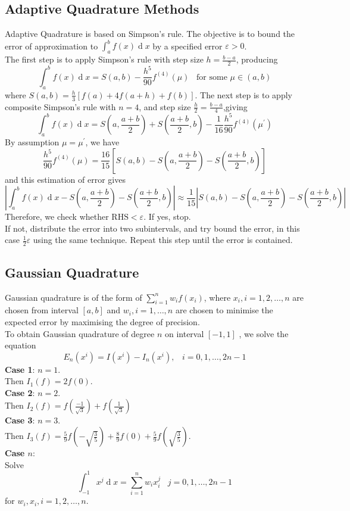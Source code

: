\documentclass[12pt]{article}
\theoremstyle{definition}
\DeclareMathOperator{\diff}{d}
\begin{document}
\subsection{Adaptive Quadrature Methods}
Adaptive Quadrature is based on Simpson's rule. The objective is to bound the error of approximation to $\int_a^bf(x)\diff x$ by a specified error $\varepsilon>0$.\\
The first step is to apply Simpson's rule with step size $h=\frac{b-a}{2}$, producing
\[
\int_a^bf(x)\diff x = S(a,b)-\frac{h^5}{90}f^{(4)}(\mu)\;\;\;\text{for some }\mu\in(a,b)
\]
where $S(a,b)= \frac{h}{3}[f(a)+4f(a+h)+f(b)]$.
The next step is to apply composite Simpson's rule with $n=4$, and step size $\frac{h}{2}=\frac{b-a}{4}$,giving
\[
\int_a^bf(x)\diff x = S(a,\frac{a+b}{2})+S(\frac{a+b}{2},b)-\frac{1}{16}\frac{h^5}{90}f^{(4)}(\mu^\prime)
\]
By assumption $\mu=\mu^\prime$, we have
\[
\frac{h^5}{90}f^{(4)}(\mu)=\frac{16}{15}[S(a,b)-S(a,\frac{a+b}{2})-S(\frac{a+b}{2},b)]
\]
and this estimation of error gives
\[
\left|\int_a^bf(x)\diff x - S(a,\frac{a+b}{2})-S(\frac{a+b}{2},b)\right|\approx \frac{1}{15}|S(a,b)- S(a,\frac{a+b}{2})-S(\frac{a+b}{2},b)|
\]
Therefore, we check whether $\text{RHS}<\varepsilon$. If yes, stop.\\
If not, distribute the error into two subintervals, and try bound the error, in this case $\frac{1}{2}\varepsilon$ using the same technique. Repeat this step until the error is contained.
\subsection{Gaussian Quadrature}
Gaussian quadrature is of the form of $\sum_{i=1}^n w_if(x_i)$, where $x_i, i=1,2,\ldots, n$ are chosen from interval $[a,b]$ and $w_i, i=1,\ldots, n$ are chosen to minimise the expected error by maximising the degree of precision.\\
To obtain Gaussian quadrature of degree $n$ on interval $[-1,1]$ , we solve the equation
\[
E_n(x^i)=I(x^i)-I_n(x^i),\;\;\; i = 0,1,\ldots, 2n-1
\]
\textbf{Case 1}: $n=1$.\\
Then $I_1(f) = 2f(0)$.\\
\textbf{Case 2}: $n=2$.\\
Then $I_2(f) = f(\frac{-1}{\sqrt{3}})+f(\frac{1}{\sqrt{3}})$\\
\textbf{Case 3}: $n=3$.\\
Then $I_3(f) = \frac{5}{9}f(-\sqrt{\frac{3}{5}})+\frac{8}{9}f(0)+\frac{5}{9}f(\sqrt{\frac{3}{5}})$.\\
\textbf{Case $n$}:\\
Solve
\[
\int_{-1}^1x^j\diff x = \sum_{i=1}^n w_ix_i^j\;\;\;j=0,1,\ldots, 2n-1
\]
for $w_i, x_i, i = 1,2,\ldots, n$.
\end{document}
